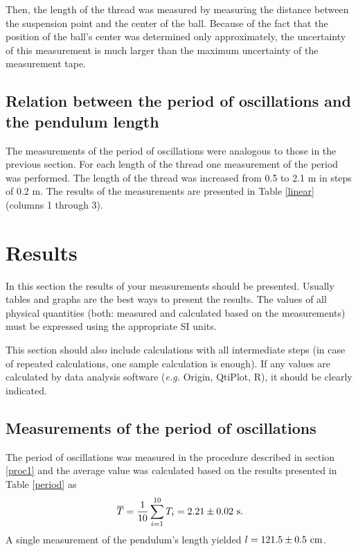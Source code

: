 \documentclass{article}
\begin{document}
Then, the length of the thread was measured by measuring the distance between the suspension point and the center of the ball.  Because of the fact that the position of the ball's center was determined only approximately, the uncertainty of this measurement is much larger than the maximum uncertainty of the measurement tape. 

\subsection{Relation between the period of oscillations and the pendulum length\label{proc2}}

The measurements of the period of oscillations were analogous to those in the previous section. For each length of the thread one measurement of the period was performed.  The length of the thread was increased from 0.5 to 2.1 m in steps of 0.2 m.  The results of the measurements are presented in Table \ref{linear} (columns 1 through 3).

\section{Results\label{results}}
{\color{blue}In this section the results of your measurements should be presented. Usually tables and graphs are the best ways to present the results. The values of all physical quantities (both: measured and calculated based on the measurements) must be expressed using the appropriate SI units.  

This section should also include calculations with all intermediate steps (in case of repeated calculations, one sample calculation is enough). If any values are calculated by data analysis 
software (\textit{e.g.} Origin, QtiPlot, R), it should be clearly indicated.}

\subsection{Measurements of the period of oscillations}

The period of oscillations was measured in the procedure described in section \ref{proc1} and the average value was calculated based on the results presented in Table \ref{period} as
$$
\overline{T} = \frac{1}{10}\sum\limits_{i=1}^{10} T_i = 2.21 \pm 0.02\ {\rm{s}}.
$$
A single measurement of the pendulum's length yielded $l=121.5 \pm 0.5\ {\rm{cm}}$.
\end{document}

